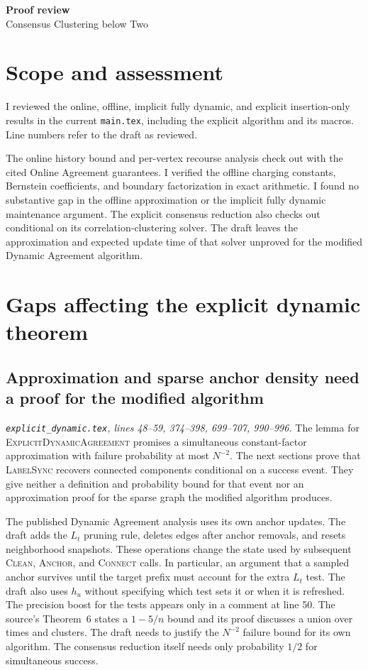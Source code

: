 \documentclass[11pt]{article}
\newcommand{\loc}[2]{\textit{#1, lines #2.}}
\newcommand{\ed}[1]{\loc{\texttt{explicit\_dynamic.tex}}{#1}}
\begin{document}
{\LARGE\bfseries Proof review}\\[0.3em]
{\large Consensus Clustering below Two}

\section*{Scope and assessment}

I reviewed the online, offline, implicit fully dynamic, and explicit
insertion-only results in the current \texttt{main.tex}, including the
explicit algorithm and its macros. Line numbers refer to the draft as
reviewed.

The online history bound and per-vertex recourse analysis check out with
the cited Online Agreement guarantees. I verified the offline charging
constants, Bernstein coefficients, and boundary factorization in exact
arithmetic. I found no substantive gap in the offline approximation or
the implicit fully dynamic maintenance argument. The explicit consensus
reduction also checks out conditional on its correlation-clustering solver.
The draft leaves the approximation and expected update time of that solver
unproved for the modified Dynamic Agreement algorithm.

\section{Gaps affecting the explicit dynamic theorem}

\subsection{Approximation and sparse anchor density need a proof for the modified algorithm}

\ed{48--59, 374--398, 699--707, 990--996}
The lemma for \textsc{ExplicitDynamicAgreement} promises a simultaneous
constant-factor approximation with failure probability at most \(N^{-2}\).
The next sections prove that \textsc{LabelSync} recovers connected
components conditional on a success event. They give neither a definition
and probability bound for that event nor an approximation proof for the
sparse graph the modified algorithm produces.

The published Dynamic Agreement analysis uses its own anchor updates.
The draft adds the \(L_t\) pruning rule, deletes edges after anchor
removals, and resets neighborhood snapshots. These operations change the
state used by subsequent \textsc{Clean}, \textsc{Anchor}, and
\textsc{Connect} calls. In particular, an argument that a sampled anchor
survives until the target prefix must account for the extra \(L_t\) test.
The draft also uses \(h_u\) without specifying which test sets it or when
it is refreshed. The precision boost for the tests appears only in a
comment at line 50. The source's Theorem~6 states a \(1-5/n\) bound and its
proof discusses a union over times and clusters. The draft needs to
justify the \(N^{-2}\) failure bound for its own algorithm. The consensus
reduction itself needs only probability \(1/2\) for simultaneous success.
\end{document}
